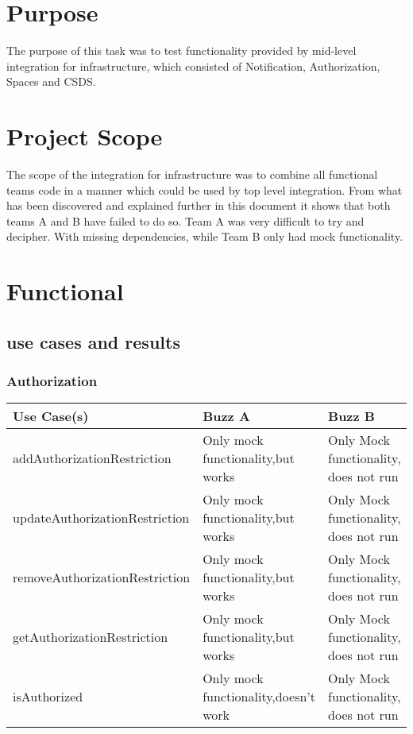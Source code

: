 \documentclass[12pt]{article}
\begin{document}
\section{Purpose} %
The purpose of this task was to test functionality provided by mid-level integration for infrastructure, which consisted of Notification, Authorization, Spaces and CSDS.


\section{Project Scope} %
The scope of the integration for infrastructure was to combine all functional teams code in a manner which could be used by top level integration. From what has been discovered and explained further in this document it shows that both teams A and B have failed to do so. Team A was very difficult to try and decipher. With missing dependencies, while Team B only had mock functionality.

\section{Functional} %
\subsection{use cases and results}

\subsubsection{Authorization}%
\begin{tabular}{|p{4.5cm}|p{4.5cm}|p{4.5cm}|}

\hline
Use Case(s) & Buzz A & Buzz B \\ 
\hline
addAuthorizationRestriction & Only mock functionality,but works & Only Mock functionality, does not run\\ %
\hline
updateAuthorizationRestriction & Only mock functionality,but works & Only Mock functionality, does not run\\ %
\hline
removeAuthorizationRestriction & Only mock functionality,but works & Only Mock functionality, does not run\\ %
\hline
getAuthorizationRestriction & Only mock functionality,but works & Only Mock functionality, does not run\\ %
\hline
isAuthorized & Only mock functionality,doesn't work & Only Mock functionality, does not run\\ %
\hline

\end{tabular}
\end{document}
